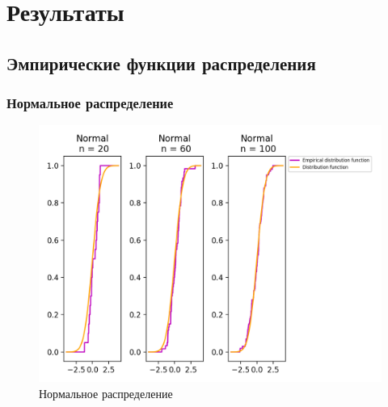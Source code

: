 \section{Результаты}
\subsection{Эмпирические функции распределения}

\subsubsection{Нормальное распределение}
\begin{figure}[H]
	\begin{center}
		\includegraphics[scale=0.7]{fig/Normal_cde.png}
		\caption{Нормальное распределение} 
		\label{pic:pic_name}
	\end{center}
\end{figure}


